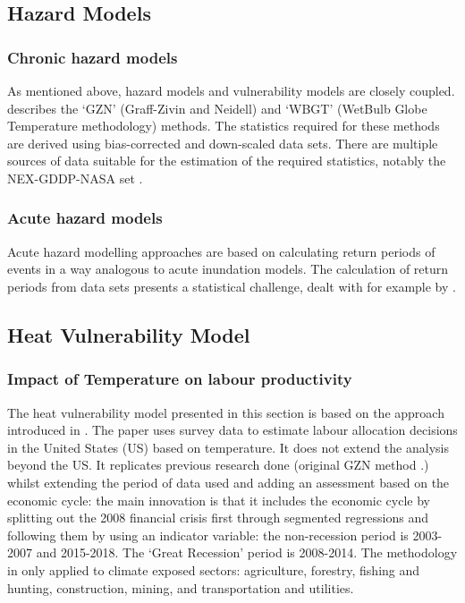 \documentclass[a4paper,11pt]{extarticle} %
\begin{document}
\subsection{Hazard Models}

\subsubsection{Chronic hazard models}
As mentioned above, hazard models and vulnerability models are closely coupled. \cite{ZhangAndShindell:2021} describes the `GZN' (Graff-Zivin and Neidell) and `WBGT' (WetBulb Globe Temperature methodology) methods. The statistics required for these methods are derived using bias-corrected and down-scaled data sets. There are multiple sources of data suitable for the estimation of the required statistics, notably the NEX-GDDP-NASA set \cite{ThrasherEtAl:2022}.



\subsubsection{Acute hazard models}
Acute hazard modelling approaches are based on calculating return periods of events in a way analogous to acute inundation models. The calculation of return periods from data sets presents a statistical challenge, dealt with for example by \cite{MentaschiEtAl:2016}.



\subsection{Heat Vulnerability Model}

\label{SubSec:HeatVulnerabilityModel}

\subsubsection{Impact of Temperature on labour productivity}

The heat vulnerability model presented in this section is based on the approach introduced in \cite{NeidellEtAl:2021}. The paper uses survey data to estimate labour allocation decisions in the United States (US) based on temperature. It does not extend the analysis beyond the US. It replicates previous research done (original GZN method \cite{NeidellEtAl:2014}.) whilst extending the period of data used and adding an assessment based on the economic cycle: the main innovation is that it includes the economic cycle by splitting out the 2008 financial crisis first through segmented regressions and following them by using an indicator variable: the non-recession period is 2003-2007 and 2015-2018. The `Great Recession' period is 2008-2014. The methodology in only applied to climate exposed sectors: agriculture, forestry, fishing and hunting, construction, mining, and transportation and utilities.
\end{document}
